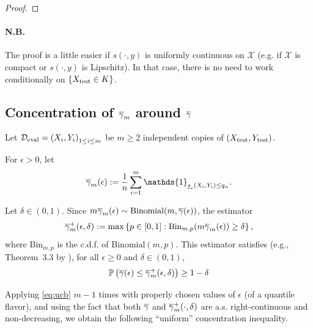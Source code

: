 \begin{proof}
    \end{proof}

    \paragraph{N.B.}
    The proof is a little easier if $s(\cdot,y)$ is uniformly continuous on $\mathcal{X}$ (e.g. if $\mathcal{X}$ is compact or $s(\cdot,y)$ is Lipschitz). In that case, there is no need to work conditionally on $\left\{X_\mathrm{test} \in K \right\}$.

    \subsection{Concentration of $\overline{\gamma}_{m}$ around $\overline{\gamma}$}

    Let $\mathcal{D}_\mathrm{eval}=\left( X_i, Y_i \right)_{1\leq i\leq m}$ be $m\geq 2$ independent copies of $(X_\mathrm{test}, Y_\mathrm{test})$.

    For $\epsilon>0$, let 
    $$
        \covmaxm(\epsilon) := \frac{1}{n} \sum\limits_{i=1}^{m}\mathds{1}_{\sie(\XYi)\leq q_\alpha}.
    $$

    Let $\delta\in(0,1)$. Since $m\overline{\gamma}_{m}(\epsilon)\sim \mathrm{Binomial}(m,\overline{\gamma}(\epsilon))$, the estimator
    $$
        \overline{\gamma}_{m}^{+}(\epsilon, \delta) := \max \left\{ p\in[0,1] : \mathrm{Bin}_{m,p}(m\overline{\gamma}_{m}(\epsilon))\geq \delta\right\},
    $$
    where $\mathrm{Bin}_{m,p}$ is the c.d.f. of $\mathrm{Binomial}(m,p)$. This estimator satisfies (e.g., Theorem~3.3 by \citealt{langford2005tutorial}), for all $\epsilon \geq 0$ and $\delta\in(0,1)$,
    \begin{equation}
        \label{eq:ucb}
        \mathbb{P}\left(\overline{\gamma}(\epsilon)\leq\overline{\gamma}_{m}^{+}(\epsilon,\delta)\right)\geq 1-\delta
    \end{equation}

    Applying \eqref{eq:ucb} $m-1$ times with properly chosen values of $\epsilon$ (of a quantile flavor), and using the fact that both $\overline{\gamma}$ and $\overline{\gamma}_{m}^{+}(\cdot, \delta)$ are a.s. right-continuous and non-decreasing, we obtain the following ``uniform'' concentration inequality.


